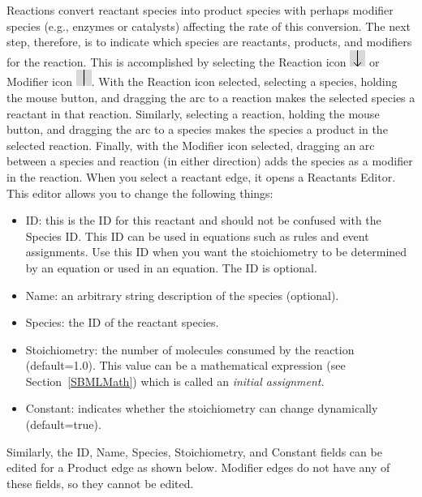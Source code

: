 \documentclass[titlepage,11pt]{article}
\begin{document}
Reactions convert reactant species into product species with perhaps modifier species (e.g., enzymes or catalysts) affecting the rate of this conversion.  The next step, therefore, is to indicate which species are reactants, products, and modifiers for the reaction.  This is accomplished by selecting the Reaction icon \includegraphics{../gui/icons/modelview/reaction_selected} or Modifier icon \includegraphics{../gui/icons/modelview/modifier_selected}.  With the Reaction icon selected, selecting a species, holding the mouse button, and dragging the arc to a reaction makes the selected species a reactant in that reaction.  Similarly, selecting a reaction, holding the mouse button, and dragging the arc to a species makes the species a product in the selected reaction.  Finally, with the Modifier icon selected, dragging an arc between a species and reaction (in either direction) adds the species as a modifier in the reaction.  When you select a reactant edge, it opens a Reactants Editor.  This editor allows you to change the following things:
\begin{itemize}
\item ID: this is the ID for this reactant and should not be confused with the Species ID.  This ID can be used in equations such as rules and event assignments.  Use this ID when you want the stoichiometry to be determined by an equation or used in an equation.  The ID is optional.
\item Name: an arbitrary string description of the species (optional).
\item Species: the ID of the reactant species.
\item Stoichiometry: the number of molecules consumed by the reaction (default=1.0).  This value can be a mathematical expression (see Section~\ref{SBMLMath}) which is called an \emph{initial assignment}.  
\item Constant: indicates whether the stoichiometry can change dynamically (default=true).  
\end{itemize}
Similarly, the ID, Name, Species, Stoichiometry, and Constant fields can be edited for a Product edge as shown below.  Modifier edges do not have any of these fields, so they cannot be edited.
\end{document}

